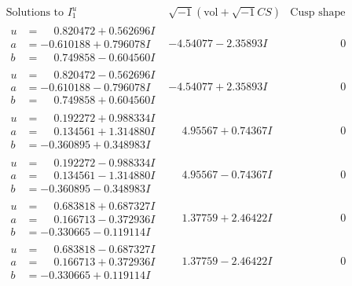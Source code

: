 \documentclass[1p]{elsarticle_modified}
\theoremstyle{definition}
\newcommand{\I}{\sqrt{-1}}
\begin{document}
$$\begin{array}{c|c|c}  
\text{Solutions to }I^u_{1}& \I (\text{vol} + \sqrt{-1}CS) & \text{Cusp shape}\\
 \hline 
\begin{aligned}
u &= \phantom{-}0.820472 + 0.562696 I \\
a &= -0.610188 + 0.796078 I \\
b &= \phantom{-}0.749858 - 0.604560 I\end{aligned}
 & -4.54077 - 2.35893 I & \phantom{-0.000000 } 0 \\ \hline\begin{aligned}
u &= \phantom{-}0.820472 - 0.562696 I \\
a &= -0.610188 - 0.796078 I \\
b &= \phantom{-}0.749858 + 0.604560 I\end{aligned}
 & -4.54077 + 2.35893 I & \phantom{-0.000000 } 0 \\ \hline\begin{aligned}
u &= \phantom{-}0.192272 + 0.988334 I \\
a &= \phantom{-}0.134561 + 1.314880 I \\
b &= -0.360895 + 0.348983 I\end{aligned}
 & \phantom{-}4.95567 + 0.74367 I & \phantom{-0.000000 } 0 \\ \hline\begin{aligned}
u &= \phantom{-}0.192272 - 0.988334 I \\
a &= \phantom{-}0.134561 - 1.314880 I \\
b &= -0.360895 - 0.348983 I\end{aligned}
 & \phantom{-}4.95567 - 0.74367 I & \phantom{-0.000000 } 0 \\ \hline\begin{aligned}
u &= \phantom{-}0.683818 + 0.687327 I \\
a &= \phantom{-}0.166713 - 0.372936 I \\
b &= -0.330665 - 0.119114 I\end{aligned}
 & \phantom{-}1.37759 + 2.46422 I & \phantom{-0.000000 } 0 \\ \hline\begin{aligned}
u &= \phantom{-}0.683818 - 0.687327 I \\
a &= \phantom{-}0.166713 + 0.372936 I \\
b &= -0.330665 + 0.119114 I\end{aligned}
 & \phantom{-}1.37759 - 2.46422 I & \phantom{-0.000000 } 0 \\ \hline\begin{aligned}

\end{aligned}
\end{array}$$
\end{document}
